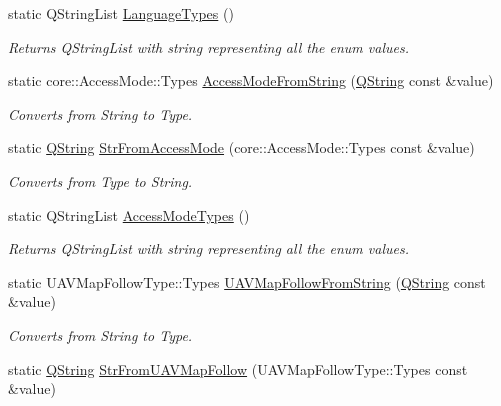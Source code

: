 \begin{DoxyCompactItemize}
static \-Q\-String\-List \hyperlink{group___o_p_map_widget_ga28c4df400106ab046111295c18abfa28}{\-Language\-Types} ()
\begin{DoxyCompactList}\small\item\em \-Returns \-Q\-String\-List with string representing all the enum values. \end{DoxyCompactList}\item 
static core\-::\-Access\-Mode\-::\-Types \hyperlink{group___o_p_map_widget_ga800ba0d0ba832cda15296dcc2bad12c5}{\-Access\-Mode\-From\-String} (\hyperlink{group___u_a_v_objects_plugin_gab9d252f49c333c94a72f97ce3105a32d}{\-Q\-String} const \&value)
\begin{DoxyCompactList}\small\item\em \-Converts from \-String to \-Type. \end{DoxyCompactList}\item 
static \hyperlink{group___u_a_v_objects_plugin_gab9d252f49c333c94a72f97ce3105a32d}{\-Q\-String} \hyperlink{group___o_p_map_widget_gaff17bf5b9d2437f75977d8456ee9e737}{\-Str\-From\-Access\-Mode} (core\-::\-Access\-Mode\-::\-Types const \&value)
\begin{DoxyCompactList}\small\item\em \-Converts from \-Type to \-String. \end{DoxyCompactList}\item 
static \-Q\-String\-List \hyperlink{group___o_p_map_widget_gacc8738b3a3d1e4f7e0f4578685d495e0}{\-Access\-Mode\-Types} ()
\begin{DoxyCompactList}\small\item\em \-Returns \-Q\-String\-List with string representing all the enum values. \end{DoxyCompactList}\item 
static \-U\-A\-V\-Map\-Follow\-Type\-::\-Types \hyperlink{group___o_p_map_widget_ga7708397f9398bd6c207bd305ee711221}{\-U\-A\-V\-Map\-Follow\-From\-String} (\hyperlink{group___u_a_v_objects_plugin_gab9d252f49c333c94a72f97ce3105a32d}{\-Q\-String} const \&value)
\begin{DoxyCompactList}\small\item\em \-Converts from \-String to \-Type. \end{DoxyCompactList}\item 
static \hyperlink{group___u_a_v_objects_plugin_gab9d252f49c333c94a72f97ce3105a32d}{\-Q\-String} \hyperlink{group___o_p_map_widget_ga94cca4ceda7e5cdea3ae019436aa0429}{\-Str\-From\-U\-A\-V\-Map\-Follow} (\-U\-A\-V\-Map\-Follow\-Type\-::\-Types const \&value)

\end{DoxyCompactItemize}
